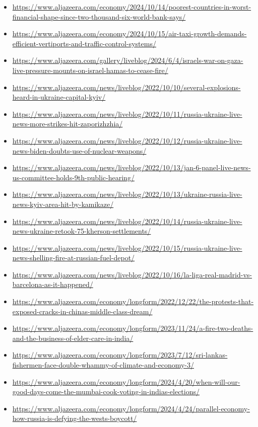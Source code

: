 \begin{itemize}
    \item \url{https://www.aljazeera.com/economy/2024/10/14/poorest-countries-in-worst-financial-shape-since-two-thousand-six-world-bank-says/}
    \item \url{https://www.aljazeera.com/economy/2024/10/15/air-taxi-growth-demands-efficient-vertiports-and-traffic-control-systems/}
    \item \url{https://www.aljazeera.com/gallery/liveblog/2024/6/4/israels-war-on-gaza-live-pressure-mounts-on-israel-hamas-to-cease-fire/}
    \item \url{https://www.aljazeera.com/news/liveblog/2022/10/10/several-explosions-heard-in-ukraine-capital-kyiv/}
    \item \url{https://www.aljazeera.com/news/liveblog/2022/10/11/russia-ukraine-live-news-more-strikes-hit-zaporizhzhia/}
    \item \url{https://www.aljazeera.com/news/liveblog/2022/10/12/russia-ukraine-live-news-biden-doubts-use-of-nuclear-weapons/}
    \item \url{https://www.aljazeera.com/news/liveblog/2022/10/13/jan-6-panel-live-news-us-committee-holds-9th-public-hearing/}
    \item \url{https://www.aljazeera.com/news/liveblog/2022/10/13/ukraine-russia-live-news-kyiv-area-hit-by-kamikaze/}
    \item \url{https://www.aljazeera.com/news/liveblog/2022/10/14/russia-ukraine-live-news-ukraine-retook-75-kherson-settlements/}
    \item \url{https://www.aljazeera.com/news/liveblog/2022/10/15/russia-ukraine-live-news-shelling-fire-at-russian-fuel-depot/}
    \item \url{https://www.aljazeera.com/news/liveblog/2022/10/16/la-liga-real-madrid-vs-barcelona-as-it-happened/}
    \item \url{https://www.aljazeera.com/economy/longform/2022/12/22/the-protests-that-exposed-cracks-in-chinas-middle-class-dream/}
    \item \url{https://www.aljazeera.com/economy/longform/2023/11/24/a-fire-two-deaths-and-the-business-of-elder-care-in-india/}
    \item \url{https://www.aljazeera.com/economy/longform/2023/7/12/sri-lankas-fishermen-face-double-whammy-of-climate-and-economy-3/}
    \item \url{https://www.aljazeera.com/economy/longform/2024/4/20/when-will-our-good-days-come-the-mumbai-cook-voting-in-indias-elections/}
    \item \url{https://www.aljazeera.com/economy/longform/2024/4/24/parallel-economy-how-russia-is-defying-the-wests-boycott/}

\end{itemize}
